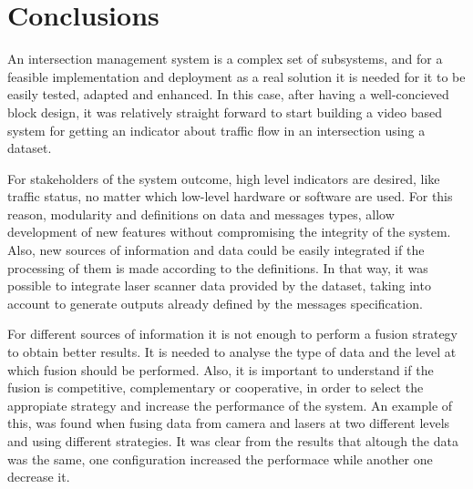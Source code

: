 \section{Conclusions}

An intersection management system is a complex set of subsystems, and for a feasible implementation and deployment as a real solution it is needed for it to be easily tested, adapted and enhanced. In this case, after having a well-concieved block design, it was relatively straight forward to start building a video based system for getting an indicator about traffic flow in an intersection using a dataset.

For stakeholders of the system outcome, high level indicators are desired, like traffic status, no matter which low-level hardware or software are used. For this reason, modularity and definitions on data and messages types, allow development of new features without compromising the integrity of the system. Also, new sources of information and data could be easily integrated if the processing of them is made according to the definitions. In that way, it was possible to integrate laser scanner data provided by the dataset, taking into account to generate outputs already defined by the messages specification.

For different sources of information it is not enough to perform a fusion strategy to obtain better results. It is needed to analyse the type of data and the level at which fusion should be performed. Also, it is important to understand if the fusion is competitive, complementary or cooperative, in order to select the appropiate strategy and increase the performance of the system. An example of this, was found when fusing data from camera and lasers at two different levels and using different strategies. It was clear from the results that altough the data was the same, one configuration increased the performace while another one decrease it.





